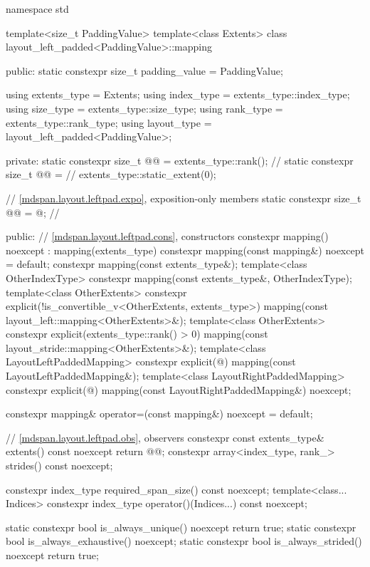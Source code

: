 \begin{codeblock}
namespace std {
  template<size_t PaddingValue>
  template<class Extents>
  class layout_left_padded<PaddingValue>::mapping {
  public:
    static constexpr size_t padding_value = PaddingValue;

    using extents_type = Extents;
    using index_type = extents_type::index_type;
    using size_type = extents_type::size_type;
    using rank_type = extents_type::rank_type;
    using layout_type = layout_left_padded<PaddingValue>;

  private:
    static constexpr size_t @@ = extents_type::rank();         // \expos
    static constexpr size_t @@ =                 // \expos
      extents_type::static_extent(0);

    // \ref{mdspan.layout.leftpad.expo}, exposition-only members
    static constexpr size_t @@ = @\seebelow@;  // \expos

  public:
    // \ref{mdspan.layout.leftpad.cons}, constructors
    constexpr mapping() noexcept : mapping(extents_type{}) {}
    constexpr mapping(const mapping&) noexcept = default;
    constexpr mapping(const extents_type&);
    template<class OtherIndexType>
      constexpr mapping(const extents_type&, OtherIndexType);
    template<class OtherExtents>
      constexpr explicit(!is_convertible_v<OtherExtents, extents_type>)
        mapping(const layout_left::mapping<OtherExtents>&);
    template<class OtherExtents>
      constexpr explicit(extents_type::rank() > 0)
        mapping(const layout_stride::mapping<OtherExtents>&);
    template<class LayoutLeftPaddedMapping>
      constexpr explicit(@\seebelow@)
        mapping(const LayoutLeftPaddedMapping&);
    template<class LayoutRightPaddedMapping>
      constexpr explicit(@\seebelow@)
        mapping(const LayoutRightPaddedMapping&) noexcept;

    constexpr mapping& operator=(const mapping&) noexcept = default;

    // \ref{mdspan.layout.leftpad.obs}, observers
    constexpr const extents_type& extents() const noexcept { return @@; }
    constexpr array<index_type, rank_> strides() const noexcept;

    constexpr index_type required_span_size() const noexcept;
    template<class... Indices>
      constexpr index_type operator()(Indices...) const noexcept;

    static constexpr bool is_always_unique() noexcept { return true; }
    static constexpr bool is_always_exhaustive() noexcept;
    static constexpr bool is_always_strided() noexcept { return true; }

}}
\end{codeblock}
